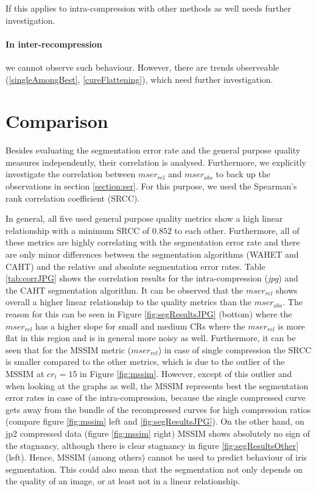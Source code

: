 \documentclass[10pt,twocolumn,letterpaper]{article}
\begin{document}
If this applies to intra-compression with other methods as well needs further investigation.

\paragraph{In inter-recompression} we cannot observe such behaviour. However, there are trends observeable (\ref{singleAmongBest}, \ref{cureFlattening}), which need further investigation. 


\section{Comparison}
\label{section:comparison}
Besides evaluating the segmentation error rate and the general purpose quality measures independently, their correlation is analysed. Furthermore, we explicitly investigate the correlation between $mser_{rel}$ and $mser_{abs}$ to back up the observations in section \ref{section:ser}.
For this purpose, we used the Spearman's rank correlation coefficient (SRCC).

In general, all five used general purpose quality metrics show a high linear relationship with a minimum SRCC of $0.852$ to each other. Furthermore, all of these metrics are highly correlating with the segmentation error rate and there are only minor differences between the segmentation algorithms (WAHET and CAHT) and the relative and absolute segmentation error rates. Table \ref{tab:corrJPG} shows the correlation results for the intra-compression (\emph{jpg}) and the CAHT segmentation algorithm. It can be observed that the $mser_{rel}$ shows overall a higher linear relationship to the quality metrics than the $mser_{abs}$. The reason for this can be seen in Figure \ref{fig:segResultsJPG} (bottom) where the $mser_{rel}$ has a higher slope for small and medium CRs where the $mser_{rel}$ is more flat in this region and is in general more noisy as well.
Furthermore, it can be seen that for the MSSIM metric ($mser_{rel}$) in case of single compression the SRCC is smaller compared to the other metrics, which is due to the outlier of the MSSIM at $cr_t = 15$ in Figure \ref{fig:mssim}. However, except of this outlier and when looking at the graphs as well, the MSSIM represents best the segmentation error rates in case of the intra-compression, because the single compressed curve gets away from the bundle of the recompressed curves for high compression ratios (compare figure \ref{fig:mssim} left and \ref{fig:segResultsJPG}).
On the other hand, on jp2 compressed data (figure \ref{fig:mssim} right) MSSIM shows absolutely no sign of the stagnancy, although there is clear stagnancy in figure \ref{fig:segResultsOther} (left). Hence, MSSIM (among others) cannot be used to predict behaviour of iris segmentation. This could also mean that the segmentation not only depends on the quality of an image, or at least not in a linear relationship.
\end{document}
